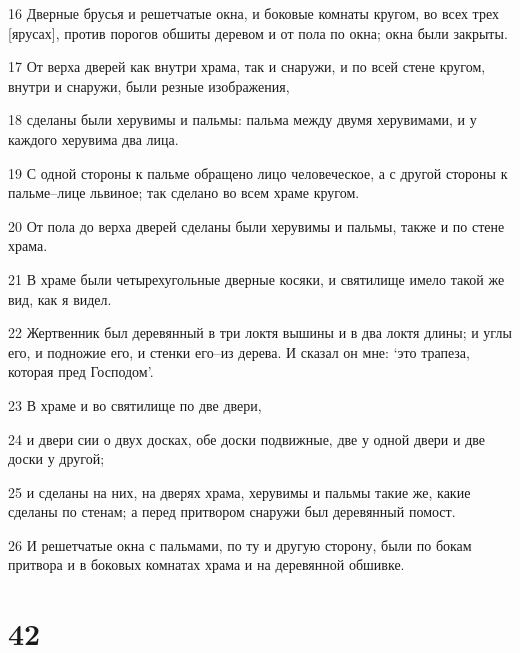 \par 16 Дверные брусья и решетчатые окна, и боковые комнаты кругом, во всех трех [ярусах], против порогов обшиты деревом и от пола по окна; окна были закрыты.
\par 17 От верха дверей как внутри храма, так и снаружи, и по всей стене кругом, внутри и снаружи, были резные изображения,
\par 18 сделаны были херувимы и пальмы: пальма между двумя херувимами, и у каждого херувима два лица.
\par 19 С одной стороны к пальме обращено лицо человеческое, а с другой стороны к пальме--лице львиное; так сделано во всем храме кругом.
\par 20 От пола до верха дверей сделаны были херувимы и пальмы, также и по стене храма.
\par 21 В храме были четырехугольные дверные косяки, и святилище имело такой же вид, как я видел.
\par 22 Жертвенник был деревянный в три локтя вышины и в два локтя длины; и углы его, и подножие его, и стенки его--из дерева. И сказал он мне: `это трапеза, которая пред Господом'.
\par 23 В храме и во святилище по две двери,
\par 24 и двери сии о двух досках, обе доски подвижные, две у одной двери и две доски у другой;
\par 25 и сделаны на них, на дверях храма, херувимы и пальмы такие же, какие сделаны по стенам; а перед притвором снаружи был деревянный помост.
\par 26 И решетчатые окна с пальмами, по ту и другую сторону, были по бокам притвора и в боковых комнатах храма и на деревянной обшивке.

\chapter{42}

